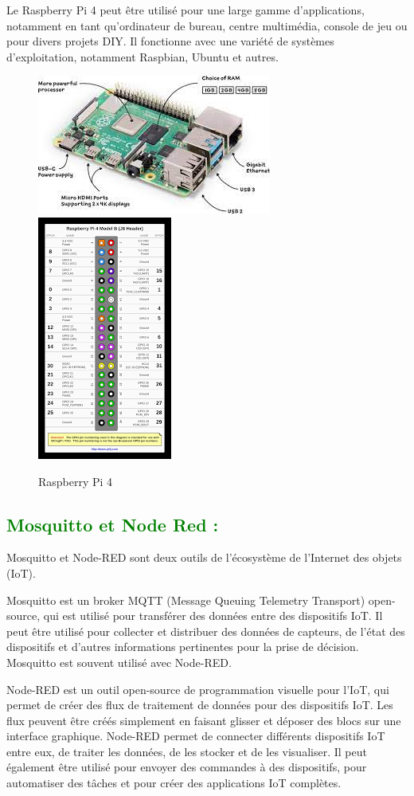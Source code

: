 \begin{flushleft}
	Le Raspberry Pi 4 peut être utilisé pour une large gamme d'applications, notamment en tant qu'ordinateur de bureau, centre multimédia, console de jeu ou pour divers projets DIY. Il fonctionne avec une variété de systèmes d'exploitation, notamment Raspbian, Ubuntu et autres.
	\begin{figure}[h]
		\centering
		\includegraphics{chapitres/images/raspberry.jpg}
		\includegraphics{chapitres/images/raspberryPi.png}
		\caption{Raspberry Pi 4}
		\label{fig:labelname}
	\end{figure}
	\newpage
	\subsection{\textcolor{green}{Mosquitto et Node Red :}}
	Mosquitto et Node-RED sont deux outils de l'écosystème de l'Internet des objets (IoT).
	
	Mosquitto est un broker MQTT (Message Queuing Telemetry Transport) open-source, qui est utilisé pour transférer des données entre des dispositifs IoT. Il peut être utilisé pour collecter et distribuer des données de capteurs, de l'état des dispositifs et d'autres informations pertinentes pour la prise de décision. Mosquitto est souvent utilisé avec Node-RED.
	
	Node-RED est un outil open-source de programmation visuelle pour l'IoT, qui permet de créer des flux de traitement de données pour des dispositifs IoT. Les flux peuvent être créés simplement en faisant glisser et déposer des blocs sur une interface graphique. Node-RED permet de connecter différents dispositifs IoT entre eux, de traiter les données, de les stocker et de les visualiser. Il peut également être utilisé pour envoyer des commandes à des dispositifs, pour automatiser des tâches et pour créer des applications IoT complètes.
	

\end{flushleft}

